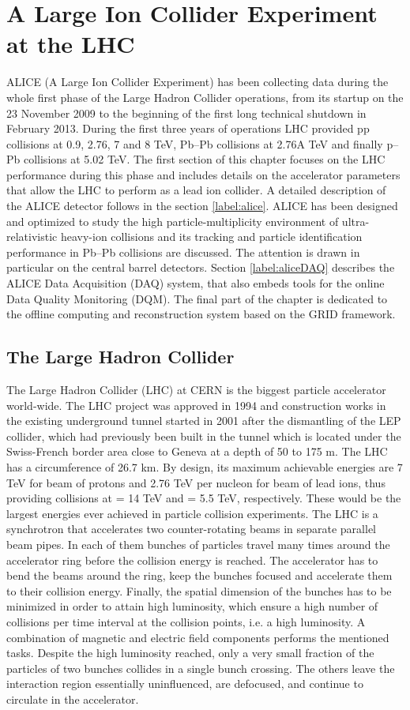 \newpage
\section{A Large Ion Collider Experiment at the LHC}
ALICE (A Large Ion Collider Experiment) has been collecting data during the whole first phase of the Large Hadron Collider operations, from its startup on the 23 November 2009 to the beginning of the first long technical shutdown in February 2013. During the first three years of operations LHC provided pp collisions at 0.9, 2.76, 7 and 8 TeV, Pb--Pb collisions at 2.76A TeV and finally p--Pb collisions at 5.02 TeV. The first section of this chapter focuses on the LHC performance during this phase and includes details on the accelerator parameters that allow the LHC to perform as a lead ion collider. A detailed description of the ALICE detector follows in the section \ref{label:alice}. ALICE has been designed and optimized to study the high particle-multiplicity environment of ultra-relativistic heavy-ion collisions and its tracking and particle identification performance in Pb--Pb collisions are discussed. The attention is drawn in particular on the central barrel detectors. Section \ref{label:aliceDAQ} describes the ALICE Data Acquisition (DAQ) system, that also embeds tools for the online Data Quality Monitoring (DQM). The final part of the chapter is dedicated to the offline computing and reconstruction system based on the GRID framework.


\subsection{The Large Hadron Collider}
The Large Hadron Collider (LHC) \cite{cite:LHC} at CERN is the biggest particle accelerator world-wide. The LHC project was approved in 1994 and construction works in the existing underground tunnel started in 2001 after the dismantling of the LEP collider, which had previously been built in the tunnel which is located under the Swiss-French border area close to Geneva at a depth of 50 to 175 m. The LHC has a circumference of 26.7 km. By design, its maximum achievable energies are 7 TeV for beam of protons and 2.76 TeV per nucleon for beam of lead ions, thus providing collisions at \s = 14 TeV and \snn = 5.5 TeV, respectively. These would be the largest energies ever achieved in particle collision experiments.
The LHC is a synchrotron that accelerates two counter-rotating beams in separate parallel beam pipes. In each of them bunches of particles travel many times around the accelerator ring before the collision energy is reached. The accelerator has to bend the beams around the ring, keep the bunches focused and accelerate them to their collision energy. Finally, the spatial dimension of the bunches has to be minimized in order to attain high luminosity, which ensure a high number of collisions per time interval at the collision points, i.e. a high luminosity. A combination of magnetic and electric field components performs the mentioned tasks. Despite the high luminosity reached, only a very small fraction of the particles of two bunches collides in a single bunch crossing. The others leave the interaction region essentially uninfluenced, are defocused, and continue to circulate in the accelerator.

